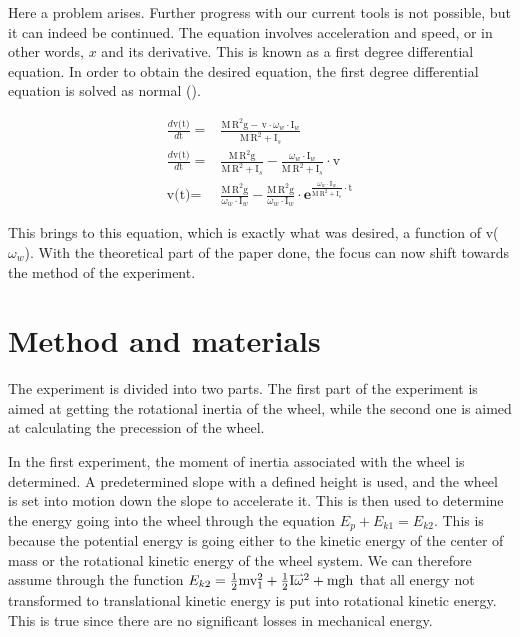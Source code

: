 \documentclass{article}
\newcommand{\myvect}[1]{\accentset{\rightharpoonup}{#1}}
\begin{document}
Here a problem arises. Further progress with our current tools is not possible, but it can indeed be continued. The equation involves acceleration and speed, or in other words, $x$ and its derivative. This is known as a first degree differential equation. In order to obtain the desired equation, the first degree differential equation is solved as normal (\cite{IBmath}).

\begin{equation*}
\begin{aligned}
    \frac{d\text{v(t)}}{d\text{t}}=&\frac{\text{M}\,\text{R}^2\text{g} - \,\text{v}\cdot\omega_{w}\cdot\text{I}_w}{\text{M}\,\text{R}^2+\text{I}_s}\\
    \frac{d\text{v(t)}}{d\text{t}}=&\frac{\text{M}\,\text{R}^2\text{g}}{\text{M}\,\text{R}^2+\text{I}_s}-\frac{\omega_{w}\cdot\text{I}_w}{\text{M}\,\text{R}^2+\text{I}_s}\cdot\text{v}\\
    \text{v(t)}=&\frac{\text{M}\,\text{R}^2\text{g}}{\omega_{w}\cdot\text{I}_w}-\frac{\text{M}\,\text{R}^2\text{g}}{\omega_{w}\cdot\text{I}_w}\cdot\textbf{e}^{\frac{\omega_{w}\cdot\text{I}_w}{\text{M}\,\text{R}^2+\text{I}_s}\cdot\text{t}}
\end{aligned}
\end{equation*}

This brings to this equation, which is exactly what was desired, a function of v($\omega_w$). With the theoretical part of the paper done, the focus can now shift towards the method of the experiment.

\pagebreak
\section{Method and materials}

The experiment is divided into two parts. The first part of the experiment is aimed at getting the rotational inertia of the wheel, while the second one is aimed at calculating the precession of the wheel.

In the first experiment, the moment of inertia associated with the wheel is determined. A predetermined slope with a defined height is used, and the wheel is set into motion down the slope to accelerate it. This is then used to determine the energy going into the wheel through the equation $E_p + E_{k1} = E_{k2}$. This is because the potential energy is going either to the kinetic energy of the center of mass or the rotational kinetic energy of the wheel system. We can therefore assume through the function $E_{k2} = \frac{1}{2}\text{mv}_{1}^{2}+\frac{1}{2}\text{I}\myvect{\omega}^{2}+\text{mgh}$ that all energy not transformed to translational kinetic energy is put into rotational kinetic energy. This is true since there are no significant losses in mechanical energy.
\end{document}
